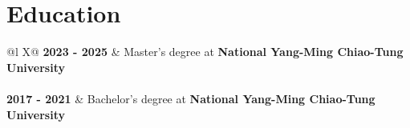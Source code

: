 \documentclass[a4paper,12pt]{article}
\begin{document}
\section{Education}
\begin{tabularx}{\linewidth}{@{}l X@{}}	
\textbf{2023 - 2025} & Master's degree at \textbf{National Yang-Ming Chiao-Tung University} \\%
  \\[3.75pt]

\textbf{2017 - 2021} & Bachelor's degree at \textbf{National Yang-Ming Chiao-Tung University} \\%
  \\ 
\end{tabularx}

\end{document}
